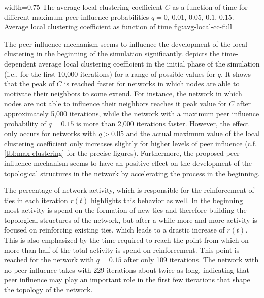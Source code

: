       {width=0.75\textwidth}
      {The average local clustering coefficient \( C \) as a function of time for different maximum peer influence probabilities \( q = 0, \, 0.01, \, 0.05, \, 0.1, \, 0.15\). }
      {Average local clustering coefficient as function of time}
      {fig:avg-local-cc-full}


The peer influence mechanism seems to influence the development of the local clustering in the beginning of the simulation significantly.
 depicts the time-dependent average local clustering coefficient in the initial phase of the simulation (i.e., for the first 10,000 iterations) for a range of possible values for \( q \).
It shows that the peak of \( C \) is reached faster for networks in which nodes are able to motivate their neighbors to some extend.
For instance, the network in which nodes are not able to influence their neighbors reaches it peak value for \( C \) after approximately 5,000 iterations, while the network with a maximum peer influence probability of \( q = 0.15 \) is more than 2,000 iterations faster.
However, the effect only occurs for networks with \( q > 0.05 \) and the actual maximum value of the local clustering coefficient only increases slightly for higher levels of peer influence (c.f. \cref{tbl:max-clustering} for the precise figures).
Furthermore, the proposed peer influence mechanism seems to have an positive effect on the development of the topological structures in the network by accelerating the process in the beginning.

The percentage of network activity, which is responsible for the reinforcement of ties in each iteration \( r(t) \) highlights this behavior as well.
In the beginning most activity is spend on the formation of new ties and therefore building the topological structures of the network, but after a while more and more activity is focused on reinforcing existing ties, which leads to a drastic increase of \( r(t) \).
This is also emphasized by the time required to reach the point from which on more than half of the total activity is spend on reinforcement.
This point is reached for the network with \( q = 0.15 \) after only 109 iterations.
The network with no peer influence takes with 229 iterations about twice as long, indicating that peer influence may play an important role in the first few iterations that shape the topology of the network.


